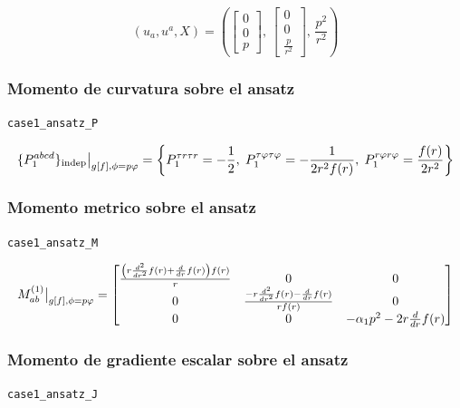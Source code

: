 \documentclass[11pt,a4paper]{article}
\begin{document}
\[
(u_a,u^a,X) = \left(\left[\begin{matrix}0\\0\\p\end{matrix}\right],\,\left[\begin{matrix}0\\0\\\frac{p}{r^{2}}\end{matrix}\right],\,\frac{p^{2}}{r^{2}}\right)
\]

\subsubsection{Momento de curvatura sobre el ansatz}

\noindent\texttt{case1\_ansatz\_P}\par\nopagebreak[4]

\[
\resizebox{\textwidth}{!}{$\displaystyle \{P_1^{abcd}\}_{\mathrm{indep}}\big|_{g[f],\phi=p\varphi} = \left\{P_1^{{\tau}{r}{\tau}{r}}=- \frac{1}{2},\;P_1^{{\tau}{\varphi}{\tau}{\varphi}}=- \frac{1}{2 r^{2} f{\left(r \right)}},\;P_1^{{r}{\varphi}{r}{\varphi}}=\frac{f{\left(r \right)}}{2 r^{2}}\right\}$}
\]

\subsubsection{Momento metrico sobre el ansatz}

\noindent\texttt{case1\_ansatz\_M}\par\nopagebreak[4]

\[
\resizebox{\textwidth}{!}{$\displaystyle M^{(1)}_{ab}\big|_{g[f],\phi=p\varphi} = \left[\begin{matrix}\frac{\left(r \frac{d^{2}}{d r^{2}} f{\left(r \right)} + \frac{d}{d r} f{\left(r \right)}\right) f{\left(r \right)}}{r} & 0 & 0\\0 & \frac{- r \frac{d^{2}}{d r^{2}} f{\left(r \right)} - \frac{d}{d r} f{\left(r \right)}}{r f{\left(r \right)}} & 0\\0 & 0 & - \alpha_{1} p^{2} - 2 r \frac{d}{d r} f{\left(r \right)}\end{matrix}\right]$}
\]

\subsubsection{Momento de gradiente escalar sobre el ansatz}

\noindent\texttt{case1\_ansatz\_J}\par\nopagebreak[4]
\end{document}
